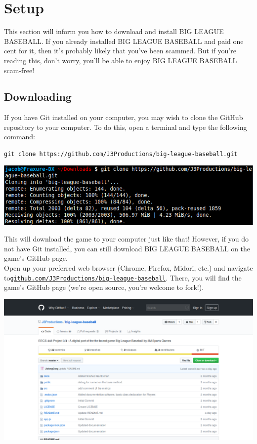 \documentclass[12pt,a4paper]{report}
\begin{document}
\chapter{Setup}
This section will inform you how to download and install BIG LEAGUE BASEBALL. If you already installed BIG LEAGUE BASEBALL and paid one cent for it, then it's probably likely that you've been scammed. But if you're reading this, don't worry, you'll be able to enjoy BIG LEAGUE BASEBALL scam-free!

\section{Downloading}
If you have Git installed on your computer, you may wish to clone the GitHub repository to your computer. To do this, open a terminal and type the following command:
\begin{displayquote}
	\texttt{git clone https://github.com/J3Productions/big-league-baseball.git}
\end{displayquote}
\begin{center}
	\includegraphics[width=1\linewidth]{umInclude/clone}
\end{center}
This will download the game to your computer just like that! However, if you do not have Git installed, you can still download BIG LEAGUE BASEBALL on the game's GitHub page.\\
Open up your preferred web browser (Chrome, Firefox, Midori, etc.) and navigate to\linebreak \href{https://github.com/J3Productions/big-league-baseball}{\texttt{github.com/J3Productions/big-league-baseball}}. There, you will find the game's GitHub page (we're open source, you're welcome to fork!).
\begin{center}
	\includegraphics[width=1\linewidth]{umInclude/github}
\end{center}
\end{document}
